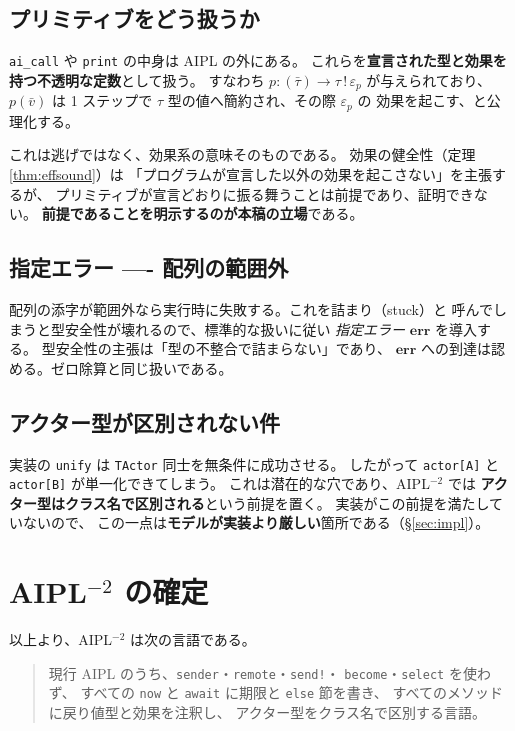 \documentclass[11pt,a4paper]{ltjsarticle}
\theoremstyle{definition}
\theoremstyle{remark}
\begin{document}
\subsection{プリミティブをどう扱うか}

\texttt{ai\_call} や \texttt{print} の中身は AIPL の外にある。
これらを\textbf{宣言された型と効果を持つ不透明な定数}として扱う。
すなわち $p : (\bar\tau) \to \tau \,!\, \varepsilon_p$ が与えられており、
$p(\bar v)$ は 1 ステップで $\tau$ 型の値へ簡約され、その際 $\varepsilon_p$ の
効果を起こす、と公理化する。

これは逃げではなく、効果系の意味そのものである。
効果の健全性（定理 \ref{thm:effsound}）は
「プログラムが宣言した以外の効果を起こさない」を主張するが、
プリミティブが宣言どおりに振る舞うことは前提であり、証明できない。
\textbf{前提であることを明示するのが本稿の立場}である。

\subsection{指定エラー ---- 配列の範囲外}
\label{sec:err}

配列の添字が範囲外なら実行時に失敗する。これを詰まり（stuck）と
呼んでしまうと型安全性が壊れるので、標準的な扱いに従い
\emph{指定エラー} $\mathbf{err}$ を導入する。
型安全性の主張は「型の不整合で詰まらない」であり、
$\mathbf{err}$ への到達は認める。ゼロ除算と同じ扱いである。

\subsection{アクター型が区別されない件}

実装の \texttt{unify} は \texttt{TActor} 同士を無条件に成功させる。
したがって \texttt{actor[A]} と \texttt{actor[B]} が単一化できてしまう。
これは潜在的な穴であり、AIPL$^{-2}$ では
\textbf{アクター型はクラス名で区別される}という前提を置く。
実装がこの前提を満たしていないので、
この一点は\textbf{モデルが実装より厳しい}箇所である（\S\ref{sec:impl}）。

\section{AIPL$^{-2}$ の確定}

以上より、AIPL$^{-2}$ は次の言語である。

\begin{quote}
現行 AIPL のうち、\texttt{sender}・\texttt{remote}・\texttt{send!}・
\texttt{become}・\texttt{select} を使わず、
すべての \texttt{now} と \texttt{await} に期限と \texttt{else} 節を書き、
すべてのメソッドに戻り値型と効果を注釈し、
アクター型をクラス名で区別する言語。
\end{quote}
\end{document}
